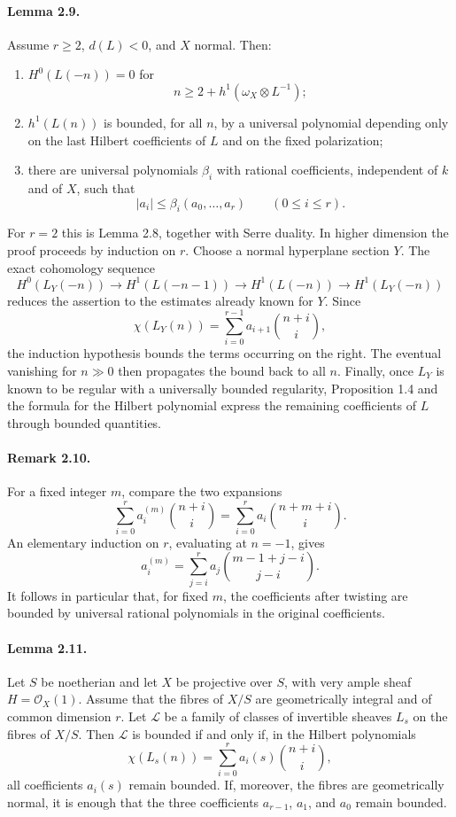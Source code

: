 \documentclass[12pt]{article}
\newcommand{\cO}{\mathcal O}
\begin{document}
\paragraph{Lemma 2.9.}
Assume $r\geq2$, $d(L)<0$, and $X$ normal. Then:
\begin{enumerate}[label=\roman*)]
\item $H^0(L(-n))=0$ for
\[
n\geq 2+h^1(\omega_X\otimes L^{-1});
\]
\item $h^1(L(n))$ is bounded, for all $n$, by a universal polynomial depending only on the last Hilbert coefficients of $L$ and on the fixed polarization;
\item there are universal polynomials $\beta_i$ with rational coefficients, independent of $k$ and of $X$, such that
\[
|a_i|\leq \beta_i(a_0,\ldots,a_r)\qquad(0\leq i\leq r).
\]
\end{enumerate}

For $r=2$ this is Lemma 2.8, together with Serre duality. In higher dimension the proof proceeds by induction on $r$. Choose a normal hyperplane section $Y$. The exact cohomology sequence
\[
H^0(L_Y(-n))\to H^1(L(-n-1))\to H^1(L(-n))\to H^1(L_Y(-n))
\]
reduces the assertion to the estimates already known for $Y$. Since
\[
\chi(L_Y(n))=\sum_{i=0}^{r-1}a_{i+1}\binom{n+i}{i},
\]
the induction hypothesis bounds the terms occurring on the right. The eventual vanishing for $n\gg0$ then propagates the bound back to all $n$. Finally, once $L_Y$ is known to be regular with a universally bounded regularity, Proposition 1.4 and the formula for the Hilbert polynomial express the remaining coefficients of $L$ through bounded quantities.

\paragraph{Remark 2.10.}
For a fixed integer $m$, compare the two expansions
\[
\sum_{i=0}^r a_i^{(m)}\binom{n+i}{i}
 =\sum_{i=0}^r a_i\binom{n+m+i}{i}.
\]
An elementary induction on $r$, evaluating at $n=-1$, gives
\[
a_i^{(m)}=\sum_{j=i}^r a_j\binom{m-1+j-i}{j-i}.
\]
It follows in particular that, for fixed $m$, the coefficients after twisting are bounded by universal rational polynomials in the original coefficients.

\paragraph{Lemma 2.11.}
Let $S$ be noetherian and let $X$ be projective over $S$, with very ample sheaf $H=\cO_X(1)$. Assume that the fibres of $X/S$ are geometrically integral and of common dimension $r$. Let $\mathscr L$ be a family of classes of invertible sheaves $L_s$ on the fibres of $X/S$. Then $\mathscr L$ is bounded if and only if, in the Hilbert polynomials
\[
\chi(L_s(n))=\sum_{i=0}^r a_i(s)\binom{n+i}{i},
\]
all coefficients $a_i(s)$ remain bounded. If, moreover, the fibres are geometrically normal, it is enough that the three coefficients $a_{r-1}$, $a_1$, and $a_0$ remain bounded.
\end{document}
